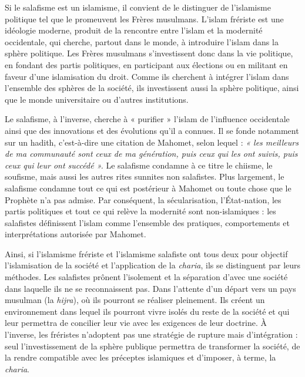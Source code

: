Si le salafisme est un islamisme, il convient de le distinguer de
l'islamisme politique tel que le promeuvent les Frères musulmans.
L'islam frériste est une idéologie moderne, produit de la rencontre
entre l'islam et la modernité occidentale, qui cherche, partout dans le
monde, à introduire l'islam dans la sphère politique. Les Frères
musulmans s'investissent donc dans la vie politique, en fondant des
partis politiques, en participant aux élections ou en militant en faveur
d'une islamisation du droit. Comme ils cherchent à intégrer l'islam dans
l'ensemble des sphères de la société, ils investissent aussi la sphère
politique, ainsi que le monde universitaire ou d'autres institutions.

Le salafisme, à l'inverse, cherche à « purifier » l'islam de l'influence
occidentale ainsi que des innovations et des évolutions qu'il a connues.
Il se fonde notamment sur un hadith, c'est-à-dire une citation de
Mahomet, selon lequel : \emph{« les meilleurs de ma communauté sont ceux
de ma génération, puis ceux qui les ont suivis, puis ceux qui leur ont
succédé ».} Le salafisme condamne à ce titre le chiisme, le soufisme,
mais aussi les autres rites sunnites non salafistes. Plus largement, le
salafisme condamne tout ce qui est postérieur à Mahomet ou toute chose
que le Prophète n'a pas admise. Par conséquent, la sécularisation,
l'État-nation, les partis politiques et tout ce qui relève la modernité
sont non-islamiques : les salafistes définissent l'islam comme
l'ensemble des pratiques, comportements et interprétations autorisée par
Mahomet.

Ainsi, si l'islamisme frériste et l'islamisme salafiste ont tous deux
pour objectif l'islamisation de la société et l'application de la
\emph{charia}, ils se distinguent par leurs méthodes. Les salafistes
prônent l'isolement et la séparation d'avec une société dans laquelle
ils ne se reconnaissent pas. Dans l'attente d'un départ vers un pays
musulman (la \emph{hijra}), où ils pourront se réaliser pleinement. Ils
créent un environnement dans lequel ils pourront vivre isolés du reste
de la société et qui leur permettra de concilier leur vie avec les
exigences de leur doctrine. À l'inverse, les fréristes n'adoptent pas
une stratégie de rupture mais d'intégration : seul l'investissement de
la sphère publique permettra de transformer la société, de la rendre
compatible avec les préceptes islamiques et d'imposer, à terme, la
\emph{charia}.




 

